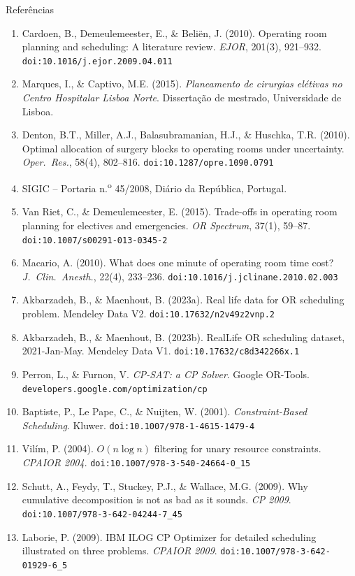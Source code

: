 \documentclass[10pt,aspectratio=169]{beamer}
\newcommand{\bk}{\hfill\hyperlink{toc}{\beamerreturnbutton{Agenda}}}
\begin{document}
\begin{frame}{Refer\^encias}
  \tiny
  \begin{enumerate}
    \item Cardoen, B., Demeulemeester, E., \& Beli\"en, J. (2010).
      Operating room planning and scheduling: A literature review.
      \emph{EJOR}, 201(3), 921--932.
      \texttt{doi:10.1016/j.ejor.2009.04.011}
    \item Marques, I., \& Captivo, M.E. (2015).
      \emph{Planeamento de cirurgias el\'etivas no Centro Hospitalar
      Lisboa Norte}. Disserta\c{c}\~ao de mestrado, Universidade de
      Lisboa.
    \item Denton, B.T., Miller, A.J., Balasubramanian, H.J., \&
      Huschka, T.R. (2010). Optimal allocation of surgery blocks to
      operating rooms under uncertainty. \emph{Oper.\ Res.}, 58(4),
      802--816. \texttt{doi:10.1287/opre.1090.0791}
    \item SIGIC -- Portaria n.\textsuperscript{o} 45/2008,
      Di\'ario da Rep\'ublica, Portugal.
    \item Van Riet, C., \& Demeulemeester, E. (2015). Trade-offs in
      operating room planning for electives and emergencies.
      \emph{OR Spectrum}, 37(1), 59--87.
      \texttt{doi:10.1007/s00291-013-0345-2}
    \item Macario, A. (2010). What does one minute of operating room
      time cost? \emph{J.\ Clin.\ Anesth.}, 22(4), 233--236.
      \texttt{doi:10.1016/j.jclinane.2010.02.003}
    \item Akbarzadeh, B., \& Maenhout, B. (2023a). Real life data for
      OR scheduling problem. Mendeley Data V2.
      \texttt{doi:10.17632/n2v49z2vnp.2}
    \item Akbarzadeh, B., \& Maenhout, B. (2023b). RealLife OR
      scheduling dataset, 2021-Jan-May. Mendeley Data V1.
      \texttt{doi:10.17632/c8d342266x.1}
    \item Perron, L., \& Furnon, V. \emph{CP-SAT: a CP Solver}.
      Google OR-Tools.
      \texttt{developers.google.com/optimization/cp}
    \item Baptiste, P., Le Pape, C., \& Nuijten, W. (2001).
      \emph{Constraint-Based Scheduling}. Kluwer.
      \texttt{doi:10.1007/978-1-4615-1479-4}
    \item Vil\'im, P. (2004). $O(n\log n)$ filtering for unary
      resource constraints. \emph{CPAIOR 2004}.
      \texttt{doi:10.1007/978-3-540-24664-0\_15}
    \item Schutt, A., Feydy, T., Stuckey, P.J., \& Wallace, M.G.
      (2009). Why cumulative decomposition is not as bad as it sounds.
      \emph{CP 2009}. \texttt{doi:10.1007/978-3-642-04244-7\_45}
    \item Laborie, P. (2009). IBM ILOG CP Optimizer for detailed
      scheduling illustrated on three problems. \emph{CPAIOR 2009}.
      \texttt{doi:10.1007/978-3-642-01929-6\_5}
  \end{enumerate}
  \bk
\end{frame}
\end{document}
